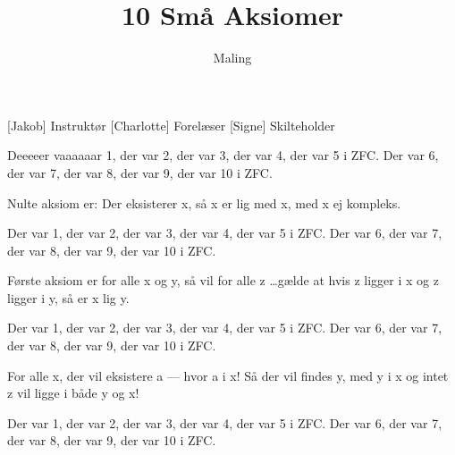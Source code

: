 \documentclass[a4paper,11pt]{article}
\title{10 Små Aksiomer}
\author{Maling}
\begin{document}
\maketitle

\begin{roles}
[Jakob] Instruktør
[Charlotte] Forelæser
[Signe] Skilteholder
\end{roles}

\begin{song}

 Deeeeer vaaaaaar 1, der var 2, der var 3, der var 4, der var 5 i ZFC. Der var 6, der var 7, der var 8, der var 9, der var 10 i ZFC.

 Nulte aksiom er: Der eksisterer x, så x er lig med x, med x ej kompleks.

 Der var 1, der var 2, der var 3, der var 4, der var 5 i ZFC. Der var 6, der var 7, der var 8, der var 9, der var 10 i ZFC.

 Første aksiom er for alle x og y, så vil for alle z \ldots gælde at hvis z ligger i x og z ligger i y, så er x lig y.

 Der var 1, der var 2, der var 3, der var 4, der var 5 i ZFC. Der var 6, der var 7, der var 8, der var 9, der var 10 i ZFC.

 For alle x, der vil eksistere a --- hvor a i x! Så der vil findes y, med y i x og intet z vil ligge i både y og x!

 Der var 1, der var 2, der var 3, der var 4, der var 5 i ZFC. Der var 6, der var 7, der var 8, der var 9, der var 10 i ZFC.

\end{song}
\end{document}
